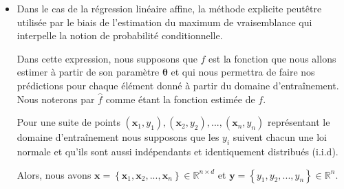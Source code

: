 \documentclass[letterpaper,11pt,english]{sphinxmanual}
\begin{document}
\begin{itemize}
\item {} 
\sphinxAtStartPar
{}

\sphinxAtStartPar
Dans le cas de la régression linéaire affine, la méthode explicite
peut\sphinxhyphen{}être utilisée par le biais de l’estimation du maximum de
vraisemblance qui interpelle la notion de probabilité conditionnelle.


\sphinxAtStartPar
Dans cette expression, nous supposons que \(f\) est la fonction
que nous allons estimer à partir de son paramètre
\(\boldsymbol{\theta}\) et qui nous permettra de faire nos
prédictions pour chaque élément donné à partir du domaine
d’entraînement. Nous noterons par \(\hat f\) comme étant la
fonction estimée de \(f\).

\sphinxAtStartPar
Pour une suite de points
\((\mathbf{x}_1, y_1), (\mathbf{x}_2, y_2),..., (\mathbf{x}_n, y_n)\)
représentant le domaine d’entraînement nous supposons que les
\(y_i\) suivent chacun une loi normale et qu’ils sont aussi
indépendants et identiquement distribués (i.i.d).

\sphinxAtStartPar
Alors, nous avons
\(\mathbf{x} = \left\lbrace \mathbf{x}_1, \mathbf{x}_2, ..., \mathbf{x}_n\right\rbrace \in \mathbb{R}^{n \times d}\)
et
\(\mathbf{y} = \left\lbrace y_1, y_2, ..., y_n\right\rbrace \in \mathbb{R}^{n}\).


\end{itemize}
\end{document}
